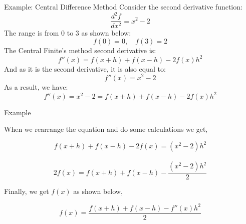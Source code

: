 \documentclass{beamer}
\begin{document}
\begin{frame}{Example: Central Difference Method}
    Consider the second derivative function:
    $$\frac{d^2 f}{dx^2} = x^2 - 2$$
    The range is from 0 to 3 as shown below:
    $$f(0) = 0, \quad f(3) = 2$$
    The Central Finite's method second derivative is:
    $$f''(x) = f(x + h) + f(x - h) - 2f(x){h^2}$$
    And as it is the second derivative, it is also equal to:
    $$f''(x) = x^2 - 2$$
    As a result, we have:
    $$f''(x) = x^2 - 2 = f(x + h) + f(x - h) - 2f(x){h^2}$$
\end{frame}
\begin{frame}{Example}


When we rearrange the equation and do some calculations we get,

$$f(x + h) + f(x - h) - 2f(x) = (x^2 - 2)h^2$$ \\

$$2f(x) = f(x + h) + f(x - h) - \frac{(x^2 - 2)h^2}{2}$$

Finally, we get $f(x)$ as shown below,

$$f(x) =\frac{ f(x+h) + f(x-h) - f''(x)h^2}{2}$$

\end{frame}
\end{document}
